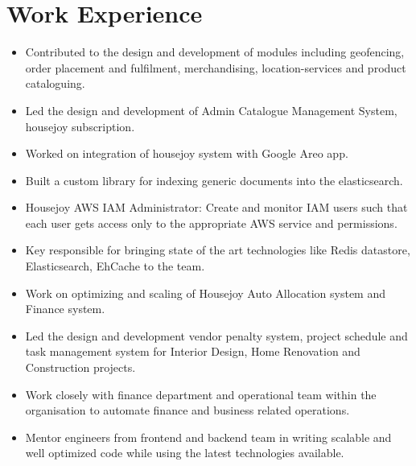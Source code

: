 \documentclass[11pt,a4paper,sans]{moderncv}        %
\begin{document}
\section{Work Experience}
\begin{itemize}
	\item Contributed to the design and development of modules including geofencing, order placement and fulfilment, merchandising, location-services and product cataloguing.

	\item Led the design and development  of Admin Catalogue Management System, housejoy subscription. 
	\item Worked on  integration of  housejoy system with Google Areo app.
	\item Built a custom library for indexing generic documents into the elasticsearch.
	\item Housejoy AWS IAM Administrator: Create and monitor IAM users such that each user gets access only to the appropriate AWS service and permissions.
	\item Key responsible for bringing state of the art technologies like Redis datastore, Elasticsearch, EhCache to the  team.
	
\end{itemize}


\begin{itemize}
	\item Work on optimizing and scaling of Housejoy Auto Allocation system and Finance system.
	\item Led the design and development vendor penalty system, project schedule and task management system for Interior Design, Home Renovation and Construction projects.
		\item Work closely with finance department and operational team within the organisation to automate finance and business related operations.
	\item Mentor engineers from frontend and backend team in writing scalable and well optimized code while using the latest technologies available.

\end{itemize}
\end{document}
